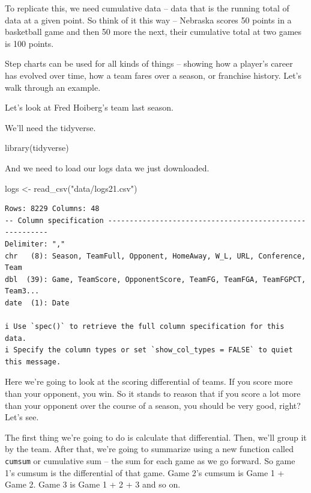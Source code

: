 \documentclass[
  letterpaper,
  DIV=11,
  numbers=noendperiod]{scrreprt}
\newenvironment{Shaded}{\begin{snugshade}}{\end{snugshade}}
\newcommand{\FunctionTok}[1]{\textcolor[rgb]{0.28,0.35,0.67}{#1}}
\newcommand{\NormalTok}[1]{\textcolor[rgb]{0.00,0.23,0.31}{#1}}
\newcommand{\OtherTok}[1]{\textcolor[rgb]{0.00,0.23,0.31}{#1}}
\newcommand{\StringTok}[1]{\textcolor[rgb]{0.13,0.47,0.30}{#1}}
\begin{document}
To replicate this, we need cumulative data -- data that is the running
total of data at a given point. So think of it this way -- Nebraska
scores 50 points in a basketball game and then 50 more the next, their
cumulative total at two games is 100 points.

Step charts can be used for all kinds of things -- showing how a
player's career has evolved over time, how a team fares over a season,
or franchise history. Let's walk through an example.

Let's look at Fred Hoiberg's team last season.

We'll need the tidyverse.

\begin{Shaded}
\begin{Highlighting}[]
\FunctionTok{library}\NormalTok{(tidyverse)}
\end{Highlighting}
\end{Shaded}

And we need to load our logs data we just downloaded.

\begin{Shaded}
\begin{Highlighting}[]
\NormalTok{logs }\OtherTok{\textless{}{-}} \FunctionTok{read\_csv}\NormalTok{(}\StringTok{"data/logs21.csv"}\NormalTok{)}
\end{Highlighting}
\end{Shaded}

\begin{verbatim}
Rows: 8229 Columns: 48
-- Column specification --------------------------------------------------------
Delimiter: ","
chr   (8): Season, TeamFull, Opponent, HomeAway, W_L, URL, Conference, Team
dbl  (39): Game, TeamScore, OpponentScore, TeamFG, TeamFGA, TeamFGPCT, Team3...
date  (1): Date

i Use `spec()` to retrieve the full column specification for this data.
i Specify the column types or set `show_col_types = FALSE` to quiet this message.
\end{verbatim}

Here we're going to look at the scoring differential of teams. If you
score more than your opponent, you win. So it stands to reason that if
you score a lot more than your opponent over the course of a season, you
should be very good, right? Let's see.

The first thing we're going to do is calculate that differential. Then,
we'll group it by the team. After that, we're going to summarize using a
new function called \texttt{cumsum} or cumulative sum -- the sum for
each game as we go forward. So game 1's cumsum is the differential of
that game. Game 2's cumsum is Game 1 + Game 2. Game 3 is Game 1 + 2 + 3
and so on.
\end{document}
